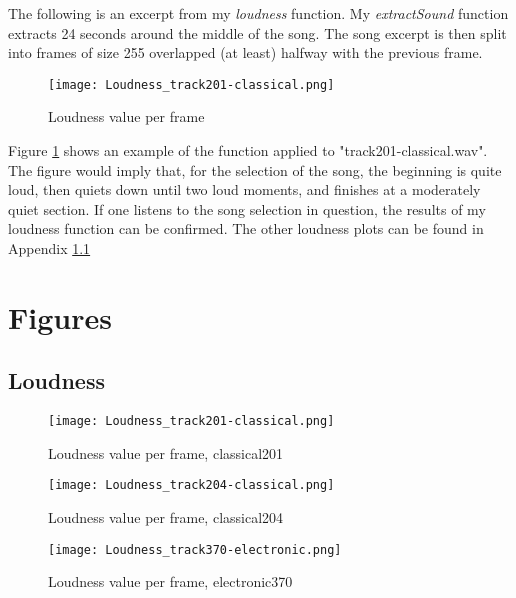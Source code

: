 \documentclass{article} %
\begin{document}
The following is an excerpt from my \emph{loudness} function. My \emph{extractSound} function extracts 24 seconds around the middle of the song. 
The song excerpt is then split into frames of size 255 overlapped (at least) halfway with the previous frame. 



\begin{figure}[h]
\centering
\texttt{[image: Loudness\_track201-classical.png]}
\caption{Loudness value per frame}
\label{fig:loudness}
\end{figure}

Figure \ref{fig:loudness} shows an example of the function applied to "track201-classical.wav". The figure would imply that, for the selection  of the song, the beginning is quite loud, 
then quiets down until two loud moments, and finishes at a moderately quiet section. If one listens to the song selection in question, the results of my loudness function can be confirmed.
The other loudness plots can be found in Appendix \ref{sec:LoudnessFigures}

\clearpage
\appendix
\section{Figures}
\subsection{Loudness}
\label{sec:LoudnessFigures}

\setcounter{figure}{0}
\begin{figure}[h!]
\centering
\texttt{[image: Loudness\_track201-classical.png]}
\caption{Loudness value per frame, classical201}
\label{fig:loudness_201}
\end{figure}


\begin{figure}
\centering
\vspace{-400em}
\texttt{[image: Loudness\_track204-classical.png]}
\caption{Loudness value per frame, classical204}
\label{fig:loudness_204}
\end{figure}

\begin{figure}
\centering
\texttt{[image: Loudness\_track370-electronic.png]}
\caption{Loudness value per frame, electronic370}
\label{fig:loudness_370}
\end{figure}
\end{document}
